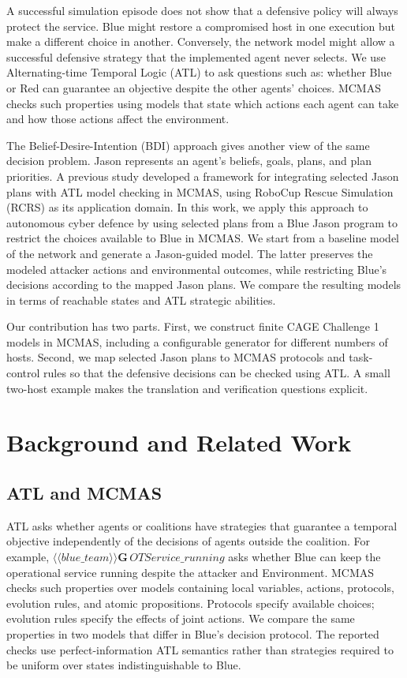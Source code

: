 \documentclass[runningheads]{llncs}
\begin{document}
A successful simulation episode does not show that a defensive policy will always protect the service. Blue might restore a compromised host in one execution but make a different choice in another. Conversely, the network model might allow a successful defensive strategy that the implemented agent never selects. We use Alternating-time Temporal Logic (ATL) \cite{alur2002atl} to ask questions such as: whether Blue or Red can guarantee an objective despite the other agents' choices. MCMAS \cite{lomuscio2017mcmas} checks such properties using models that state which actions each agent can take and how those actions affect the environment.


The Belief-Desire-Intention (BDI) approach gives another view of the same decision problem. Jason \cite{bordini2007jason} represents an agent's beliefs, goals, plans, and plan priorities. A previous study \cite{RCRSPreprint} developed a framework for integrating selected Jason plans with ATL model checking in MCMAS, using RoboCup Rescue Simulation (RCRS) as its application domain. In this work, we apply this approach to autonomous cyber defence by using selected plans from a Blue Jason program to restrict the choices available to Blue in MCMAS. We start from a baseline model of the network and generate a Jason-guided model. The latter preserves the modeled attacker actions and environmental outcomes, while restricting Blue's decisions according to the mapped Jason plans. We compare the resulting models in terms of reachable states and ATL strategic abilities.


Our contribution has two parts. First, we construct finite CAGE Challenge 1 models in MCMAS, including a configurable generator for different numbers of hosts. Second, we map selected Jason plans to MCMAS protocols and task-control rules so that the defensive decisions can be checked using ATL. A small two-host example makes the translation and verification questions explicit. 
\section{Background and Related Work}

\subsection{ATL and MCMAS}

ATL \cite{alur2002atl} asks whether agents or coalitions have strategies that guarantee a temporal objective independently of the decisions of agents outside the coalition. For example, $\langle\!\langle\mathit{blue\_team}\rangle\!\rangle \mathbf{G}\,\mathit{OTService\_running}$ asks whether Blue can keep the operational service running despite the attacker and Environment. MCMAS \cite{lomuscio2017mcmas} checks such properties over models containing local variables, actions, protocols, evolution rules, and atomic propositions. Protocols specify available choices; evolution rules specify the effects of joint actions. We compare the same properties in two models that differ in Blue's decision protocol. The reported checks use perfect-information ATL semantics rather than strategies required to be uniform over states indistinguishable to Blue.
\end{document}
